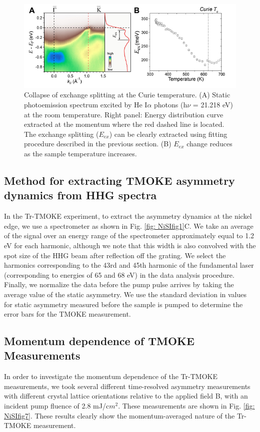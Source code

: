 \begin{figure}[htbp]
	\begin{center}
		\includegraphics[width=150mm]{figs/NiFigS6}
	\end{center}
	\caption{Collapse of exchange splitting at the Curie temperature. (A) Static photoemission spectrum excited by He I$\alpha$ photons (h$\nu$ = 21.218 eV) at the room temperature. Right panel: Energy distribution curve extracted at the momentum where the red dashed line is located. The exchange splitting ($E_{ex}$) can be clearly extracted using fitting procedure described in the previous section. (B) $E_{ex}$ change reduces as the sample temperature increases.}
	\label{fig: NiSIfig6}
\end{figure}

\subsection{Method for extracting TMOKE asymmetry dynamics from HHG spectra}
In the Tr-TMOKE experiment, to extract the asymmetry dynamics at the nickel edge, we use a spectrometer as shown in Fig. \ref{fig: NiSIfig1}C. We take an average of the signal over an energy range of the spectrometer approximately equal to 1.2 eV for each harmonic, although we note that this width is also convolved with the spot size of the HHG beam after reflection off the grating. We select the harmonics corresponding to the 43rd and 45th harmonic of the fundamental laser (corresponding to energies of 65 and 68 eV) in the data analysis procedure. Finally, we normalize the data before the pump pulse arrives by taking the average value of the static asymmetry. We use the standard deviation in values for static asymmetry measured before the sample is pumped to determine the error bars for the TMOKE measurement.

\subsection{Momentum dependence of TMOKE Measurements}
In order to investigate the momentum dependence of the Tr-TMOKE measurements, we took several different time-resolved asymmetry measurements with different crystal lattice orientations relative to the applied field B, with an incident pump fluence of 2.8 mJ/c$m^2$. These measurements are shown in Fig. \ref{fig: NiSIfig7}. These results clearly show the momentum-averaged nature of the Tr-TMOKE measurement.


